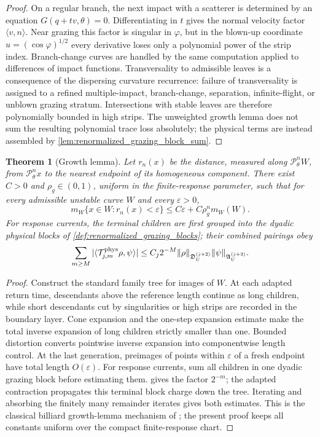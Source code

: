 \documentclass[11pt]{amsart}
\theoremstyle{compactplain}
\newtheorem{theorem}{Theorem}[section]
\theoremstyle{compactdefinition}
\theoremstyle{compactremark}
\newcommand{\Pcal}{\mathcal P}
\begin{document}
\begin{proof}
On a regular branch, the next impact with a scatterer is determined by an
equation $G(q+tv,\theta)=0$.  Differentiating in $t$ gives the normal velocity
factor $\langle v,n\rangle$.  Near grazing this factor is singular in
$\varphi$, but in the blown-up coordinate $u=(\cos\varphi)^{1/2}$ every
derivative loses only a polynomial power of the strip index.  Branch-change
curves are handled by the same computation applied to differences of impact
functions.  Transversality to admissible leaves is a consequence of the
dispersing curvature recurrence: failure of transversality is assigned to a
refined multiple-impact, branch-change, separation, infinite-flight, or unblown
grazing stratum.  Intersections with stable leaves are therefore polynomially
bounded in high strips.  The unweighted growth lemma does not sum the resulting
polynomial trace loss absolutely; the physical terms are instead assembled by
\cref{lem:renormalized_grazing_block_sum}.
\end{proof}

\begin{theorem}[Growth lemma]
\label{thm:growth_lemma}
Let $r_n(x)$ be the distance, measured along $\Pcal_\theta^n W$, from
$\Pcal_\theta^n x$ to the nearest endpoint of its homogeneous component.  There
exist $C>0$ and $\rho_g\in(0,1)$, uniform in the finite-response parameter,
such that for every admissible unstable curve $W$ and every $\varepsilon>0$,
\begin{equation}
  m_W\{x\in W:r_n(x)<\varepsilon\}
  \le C\varepsilon+C\rho_g^n m_W(W).
\end{equation}
For response currents, the terminal children are first grouped into the
dyadic physical blocks of \cref{def:renormalized_grazing_blocks}; their
combined pairings obey
\[
  \sum_{m\ge M}
  |\langle\mathcal T_{j,m}^{\rm phys}\rho,\psi\rangle|
  \le C_j2^{-M}
  \|\rho\|_{\mathfrak D_U^{(j+2)}}
  \|\psi\|_{\mathfrak A_U^{(j+3)}}.
\]
\end{theorem}

\begin{proof}
Construct the standard family tree for images of $W$.  At each adapted return
time, descendants above the reference length continue as long children, while
short descendants cut by singularities or high strips are recorded in the
boundary layer.  Cone expansion and the one-step expansion estimate make the
total inverse expansion of long children strictly smaller than one.  Bounded
distortion converts pointwise inverse expansion into componentwise length
control.  At the last generation, preimages of points within $\varepsilon$ of a
fresh endpoint have total length $O(\varepsilon)$.  For response currents,
sum all children in one dyadic grazing block before estimating them.
 gives the factor
\(2^{-m}\); the adapted contraction propagates this terminal block
charge down the tree.  Iterating and absorbing the finitely many remainder
iterates gives both estimates.
This is the classical billiard growth-lemma mechanism of
\cite{chernov2006chaotic,ChernovZhang2009}; the present proof keeps all
constants uniform over the compact finite-response chart.
\end{proof}
\end{document}
